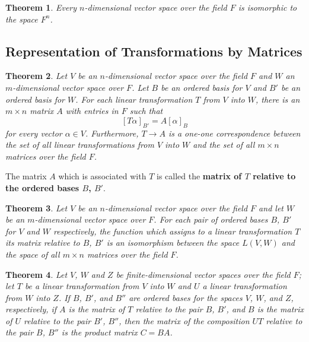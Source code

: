 \documentclass{article}
\newtheorem{theorem}{Theorem}[section]
\begin{document}
\begin{theorem}
  Every $n$-dimensional vector space over the field $F$ is isomorphic to the
  space $F^n$.
\end{theorem}

\subsection{Representation of Transformations by Matrices}

\begin{theorem}
  Let $V$ be an $n$-dimensional vector space over the field $F$ and $W$ an
  $m$-dimensional vector space over $F$. Let $B$ be an ordered basis for $V$ and
  $B'$ be an ordered basis for $W$. For each linear transformation $T$ from $V$
  into $W$, there is an $m \times n$ matrix $A$ with entries in $F$ such that \[
    [T\alpha]_{B'} = A[\alpha]_B
  \] for every vector $\alpha \in V$. Furthermore, $T \to A$ is a one-one
  correspondence between the set of all linear transformations from $V$ into $W$
  and the set of all $m \times n$ matrices over the field $F$.
\end{theorem}

The matrix $A$ which is associated with $T$ is called the \textbf{matrix of $T$
relative to the ordered bases $B$, $B'$}.

\begin{theorem}
  Let $V$ be an $n$-dimensional vector space over the field $F$ and let $W$ be
  an $m$-dimensional vector space over $F$. For each pair of ordered bases $B$,
  $B'$ for $V$ and $W$ respectively, the function which assigns to a linear
  transformation $T$ its matrix relative to $B$, $B'$ is an isomorphism between
  the space $L(V, W)$ and the space of all $m \times n$ matrices over the field
  $F$.
\end{theorem} 

\begin{theorem}
  Let $V$, $W$ and $Z$ be finite-dimensional vector spaces over the field $F$;
  let $T$ be a linear transformation from $V$ into $W$ and $U$ a linear
  transformation from $W$ into $Z$. If $B$, $B'$, and $B''$ are ordered bases
  for the spaces $V$, $W$, and $Z$, respectively, if $A$ is the matrix of $T$
  relative to the pair $B$, $B'$, and $B$ is the matrix of $U$ relative to the
  pair $B'$, $B''$, then the matrix of the composition $UT$ relative to the pair
  $B$, $B''$ is the product matrix $C = BA$.
\end{theorem}
\end{document}
